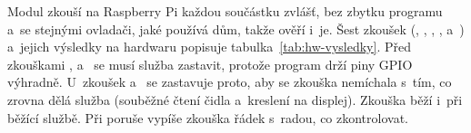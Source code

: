 Modul  zkouší na Raspberry Pi každou součástku zvlášť, bez zbytku programu
a~se stejnými ovladači, jaké používá dům, takže ověří i~je. Šest zkoušek (,
, , ,  a~) a~jejich výsledky na hardwaru
popisuje tabulka~\ref{tab:hw-vysledky}. Před zkouškami ,  a~ se musí
služba zastavit, protože program drží piny GPIO výhradně. U~zkoušek 
a~ se zastavuje proto, aby se zkouška nemíchala s~tím, co zrovna dělá služba
(souběžné čtení čidla a~kreslení na displej). Zkouška  běží i~při běžící službě. Při
poruše vypíše zkouška řádek  s~radou, co zkontrolovat.

